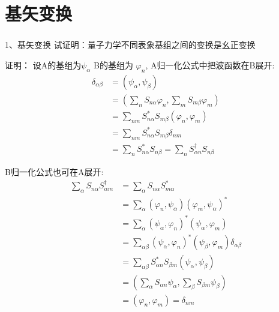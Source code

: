 \section{基矢变换}
\begin{frame} 
    \frametitle{}
    \begin{tcolorbox1}{1、基矢变换}
        试证明：量子力学不同表象基组之间的变换是幺正变换  
    \end{tcolorbox1}
    \alert{证明：} 设A的基组为$\psi_\alpha$ B的基组为 $\varphi_n$, A归一化公式中把波函数在B展开: 
    \begin{equation*}
        \begin{split}
            \delta_{\alpha\beta} &= (\psi_\alpha, \psi_\beta) \\
            &= (\sum_n S_{n\alpha} \varphi_n, \sum_m S_{m\beta} \varphi_m)\\
            &= \sum_{nm} S_{n\alpha} ^* S_{m\beta}(\varphi_n, \varphi_m)\\
            &= \sum_{nm} S_{n\alpha} ^* S_{m\beta}\delta_{nm}\\
            &= \sum_{n} S_{n\alpha} ^* S_{n\beta} = \sum_{n} S^{\dagger } _{\alpha n} S_{n\beta}
        \end{split} 
    \end{equation*}
\end{frame}

\begin{frame} 
    B归一化公式也可在A展开: 
    \begin{equation*}
        \begin{split}
            \sum_{\alpha} S_{n\alpha}  S^{\dagger } _{\alpha m}&=\sum_{\alpha} S_{n\alpha}  S_{m \alpha} ^* \\
            &=\sum_{\alpha} (\varphi_n, \psi_\alpha) (\varphi_m, \psi_\alpha)^* \\
            &=\sum_{\alpha} (\psi_\alpha,\varphi_n)^* (\psi_\alpha,\varphi_m) \\
            &=\sum_{\alpha\beta} (\psi_\alpha,\varphi_n)^* (\psi_\beta,\varphi_m) \delta_{\alpha\beta} \\
            &=\sum_{\alpha\beta} S_{\alpha n}^*  S_{\beta m} (\psi_\alpha,\psi_\beta)\\
            &= (\sum_{\alpha} S_{\alpha n}\psi_\alpha,\sum_{\beta} S_{\beta m}\psi_\beta)\\
            &= (\varphi_n,\varphi_m) =\delta_{nm} 
        \end{split} 
    \end{equation*}
\end{frame}

